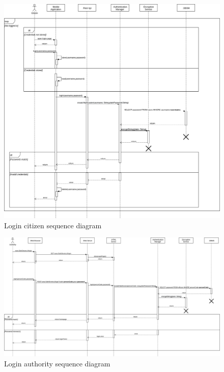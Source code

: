 \documentclass{article}
\begin{document}
	\begin{figure}[h]
		\includegraphics[width=\linewidth]{images/Login(Citizen)_sequence_diagram.png}
		\caption{Login citizen sequence diagram}
	\end{figure}
	\begin{figure}[h]
		\includegraphics[width=\linewidth]{images/Login(authority)_sequence_diagram.png}
		\caption{Login authority sequence diagram}
	\end{figure}
	
\end{document}
